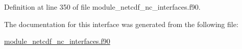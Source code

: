 Definition at line 350 of file module\+\_\+netcdf\+\_\+nc\+\_\+interfaces.\+f90.



The documentation for this interface was generated from the following file\+:\begin{DoxyCompactItemize}
\item 
\hyperlink{module__netcdf__nc__interfaces_8f90}{module\+\_\+netcdf\+\_\+nc\+\_\+interfaces.\+f90}\end{DoxyCompactItemize}
